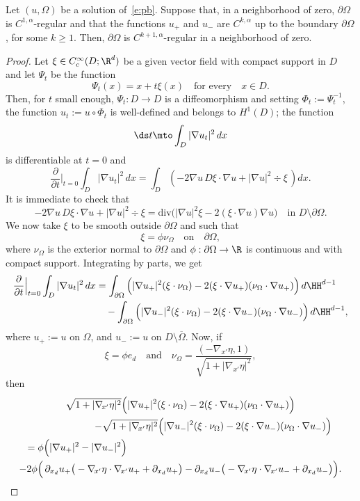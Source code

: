 \begin{lemma} \label{l:reg2}
Let $(u,\Omega)$ be a solution of~\eqref{e:pb}. Suppose that, in a neighborhood of zero, $\partial\Omega$ is $C^{1,\alpha}$-regular and that the functions $u_+$ and $u_-$ are $C^{k,\alpha}$ up to the boundary $\partial\Omega$, for some $k\ge 1$. Then, $\partial\Omega$ is $C^{k+1,\alpha}$-regular in a neighborhood of zero.
\end{lemma}
\begin{proof}
Let $\xi\in C^\infty_c(D ;\R^d)$ be a given vector field with compact support in $D$ and let $\Psi_t$ be the function
\[\Psi_t(x)=x+t\xi (x)\quad\text{for every}\quad x\in D.\]
Then, for $t$ small enough, $\Psi_t: D\to D$ is a diffeomorphism and setting $\Phi_t:=\Psi_t^{-1}$, the function $u_t:=u\circ \Phi_t$ is well-defined and belongs to $H^1(D)$; the function
\[
\ds t\mto\int_{D}|\nabla u_t|^2\,dx
\]
is differentiable at $t=0$ and
\[\frac{\partial}{\partial t}\Big\vert_{t=0}\int_{D}|\nabla u_t|^2\,dx= \int_{D}\left(-2\nabla u\, D\xi\cdot \nabla u+ |\nabla u|^2\div\xi\,\right)dx.\]
It is immediate to check that
\[-2\nabla u\, D\xi\cdot \nabla u+ |\nabla u|^2\div\xi = \text{div}\big(|\nabla u|^2\xi-2(\xi\cdot\nabla u)\nabla u\big)\quad\text{in } D\setminus\partial\Omega.\]
We now take $\xi$ to be smooth outside $\partial \Omega$ and such that
\[\xi=\phi \nu_\Omega\quad\text{on}\quad \partial\Omega,\]
where $\nu_\Omega$ is the exterior normal to
$\partial\Omega$ and $\phi:\partial\Omega\to\R$ is continuous and with compact support. Integrating by parts, we get
\begin{align*}
\frac{\partial}{\partial t}\Big\vert_{t=0}\int_{D}|\nabla u_t|^2\,dx&=\int_{\partial\Omega}\Big(|\nabla u_+|^2(\xi\cdot\nu_\Omega)-2(\xi\cdot\nabla u_+)(\nu_\Omega\cdot\nabla u_+)\Big)\,d\HH^{d-1}\\
&\quad-\int_{\partial\Omega}\Big(|\nabla u_-|^2(\xi\cdot\nu_\Omega)-2(\xi\cdot\nabla u_-)(\nu_\Omega\cdot\nabla u_-)\Big)\,d\HH^{d-1},
\end{align*}
where $u_+:=u$ on $\Omega$, and $u_-:=u$ on $D\setminus\overline \Omega$. Now, if
\[\xi=\phi e_d\quad\text{and}\quad\nu_\Omega=\frac{(-\nabla_{\!x'}\eta,1)}{\sqrt{1+|\nabla_{\!x'}\eta|^2}},\]
then
\begin{multline*}
\sqrt{1+|\nabla_{\!x'}\eta|^2}\Big(|\nabla u_+|^2(\xi\cdot\nu_\Omega)-2(\xi\cdot\nabla u_+)(\nu_\Omega\cdot\nabla u_+)\Big)\\
\shoveright{-\sqrt{1+|\nabla_{\!x'}\eta|^2}\Big(|\nabla u_-|^2(\xi\cdot\nu_\Omega)-2(\xi\cdot\nabla u_-)(\nu_\Omega\cdot\nabla u_-)\Big)}\\
\shoveleft{=\phi\Big(|\nabla u_+|^2-|\nabla u_-|^2\Big)}\\
-2\phi\Big(\,\partial_{x_d}u_+\big(-\nabla_{\!x'}\eta\cdot\nabla_{\!x'}u_++\partial_{x_d}u_+\big)-\partial_{x_d}u_-\big(-\nabla_{\!x'}\eta\cdot\nabla_{\!x'}u_-+\partial_{x_d}u_-\big)\Big).
\end{multline*}


\end{proof}
